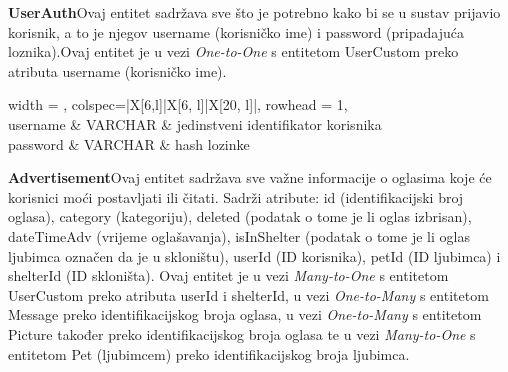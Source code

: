 			\textbf{UserAuth}\hspace{10pt}Ovaj entitet sadržava sve što je potrebno kako bi se u sustav prijavio korisnik, a to je njegov username (korisničko ime) i password (pripadajuća loznika).Ovaj entitet je u vezi
			\textit{One-to-One} s entitetom UserCustom preko atributa username (korisničko ime).
			
				\begin{longtblr}[
					label=none,
					entry=none
					]{
						width = \textwidth,
						colspec={|X[6,l]|X[6, l]|X[20, l]|}, 
						rowhead = 1,
					} %
					\hline {}	 \\ \hline[3pt]
						username & VARCHAR &  jedinstveni identifikator korisnika  	\\ \hline
					password & VARCHAR	&  hash lozinke	\\ \hline
				\end{longtblr}
				
			
			\textbf{Advertisement}\hspace{10pt}Ovaj entitet sadržava sve važne informacije o oglasima koje će korisnici moći postavljati ili čitati.
			Sadrži atribute: id (identifikacijski broj oglasa), category (kategoriju), deleted (podatak o tome je li oglas izbrisan), dateTimeAdv (vrijeme oglašavanja), isInShelter (podatak o tome je li oglas ljubimca označen da je u skloništu), userId (ID korisnika), petId (ID ljubimca) i shelterId (ID skloništa).
			Ovaj entitet je u vezi
			\textit{Many-to-One} s entitetom UserCustom preko atributa userId i shelterId,
			u vezi \textit{One-to-Many} s entitetom Message preko identifikacijskog broja oglasa,
			u vezi \textit{One-to-Many} s entitetom Picture također preko identifikacijskog broja oglasa
			te u vezi \textit{Many-to-One} s entitetom Pet (ljubimcem) preko identifikacijskog broja ljubimca.
			
